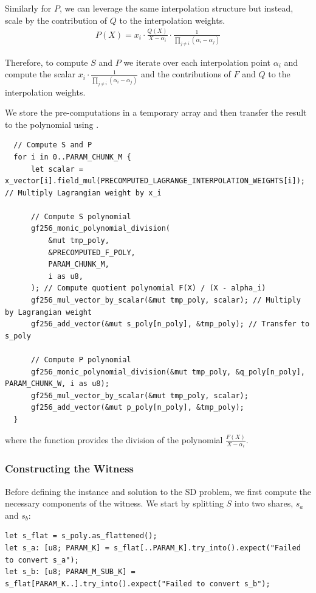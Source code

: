 \documentclass[11pt]{report}
\theoremstyle{definition}
\theoremstyle{plain}
\begin{document}
Similarly for $P$, we can leverage the same interpolation structure but instead, scale by the contribution of $Q$ to the interpolation weights.
\begin{align*}
  P(X) = x_i \cdot \frac{Q(X)}{X - \alpha_i} \cdot \frac{1}{\prod_{j\neq i}(\alpha_i - \alpha_j)}
\end{align*}

Therefore, to compute $S$ and $P$ we iterate over each interpolation point $\alpha_i$ and compute the scalar $x_i \cdot \frac{1}{\prod_{j\neq i}(\alpha_i - \alpha_j)}$ and the contributions of $F$ and $Q$ to the interpolation weights.

We store the pre-computations in a temporary array  and then transfer the result to the polynomial  using .
\begin{verbatim}
  // Compute S and P
  for i in 0..PARAM_CHUNK_M {
      let scalar = x_vector[i].field_mul(PRECOMPUTED_LAGRANGE_INTERPOLATION_WEIGHTS[i]); // Multiply Lagrangian weight by x_i

      // Compute S polynomial
      gf256_monic_polynomial_division(
          &mut tmp_poly,
          &PRECOMPUTED_F_POLY,
          PARAM_CHUNK_M,
          i as u8,
      ); // Compute quotient polynomial F(X) / (X - alpha_i)
      gf256_mul_vector_by_scalar(&mut tmp_poly, scalar); // Multiply by Lagrangian weight
      gf256_add_vector(&mut s_poly[n_poly], &tmp_poly); // Transfer to s_poly

      // Compute P polynomial
      gf256_monic_polynomial_division(&mut tmp_poly, &q_poly[n_poly], PARAM_CHUNK_W, i as u8);
      gf256_mul_vector_by_scalar(&mut tmp_poly, scalar);
      gf256_add_vector(&mut p_poly[n_poly], &tmp_poly);
  }
\end{verbatim}

where the function  provides the division of the polynomial $\frac{F(X)}{X - \alpha_i}$.

\subsubsection{Constructing the Witness}

Before defining the instance and solution to the SD problem, we first compute the necessary components of the witness. We start by splitting $S$ into two shares, $s_a$ and $s_b$:

\begin{verbatim}
let s_flat = s_poly.as_flattened();
let s_a: [u8; PARAM_K] = s_flat[..PARAM_K].try_into().expect("Failed to convert s_a");
let s_b: [u8; PARAM_M_SUB_K] = s_flat[PARAM_K..].try_into().expect("Failed to convert s_b");
\end{verbatim}
\end{document}
